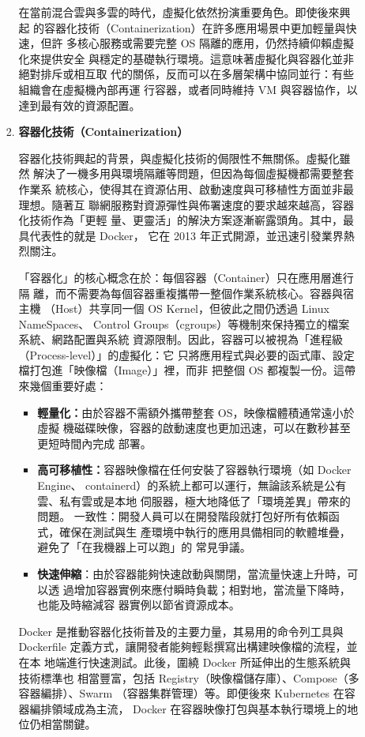 \documentclass[12pt,a4paper]{article}
\begin{document}
\begin{enumerate}[label={(\zhdig*)}, leftmargin=2\parindent, listparindent=\parindent]
\begin{enumerate}[label={(\arabic*)}, leftmargin=\parindent, listparindent=\parindent]
\begin{enumerate}[label={(\zhdig*)}, leftmargin=2\parindent, listparindent=\parindent]
    在當前混合雲與多雲的時代，虛擬化依然扮演重要角色。即使後來興起
    的容器化技術（Containerization）在許多應用場景中更加輕量與快速，但許
    多核心服務或需要完整 OS 隔離的應用，仍然持續仰賴虛擬化來提供安全
    與穩定的基礎執行環境。這意味著虛擬化與容器化並非絕對排斥或相互取
    代的關係，反而可以在多層架構中協同並行：有些組織會在虛擬機內部再運
    行容器，或者同時維持 VM 與容器協作，以達到最有效的資源配置。
\item\textbf{
容器化技術（Containerization）\cite{9}
}

容器化技術興起的背景，與虛擬化技術的侷限性不無關係。虛擬化雖然
解決了一機多用與環境隔離等問題，但因為每個虛擬機都需要整套作業系
統核心，使得其在資源佔用、啟動速度與可移植性方面並非最理想。隨著互
聯網服務對資源彈性與佈署速度的要求越來越高，容器化技術作為「更輕
量、更靈活」的解決方案逐漸嶄露頭角。其中，最具代表性的就是 Docker，
它在 2013 年正式開源，並迅速引發業界熱烈關注。

「容器化」的核心概念在於：每個容器（Container）只在應用層進行隔
離，而不需要為每個容器重複攜帶一整個作業系統核心。容器與宿主機
（Host）共享同一個 OS Kernel，但彼此之間仍透過 Linux NameSpaces、
Control Groups（cgroups）等機制來保持獨立的檔案系統、網路配置與系統
資源限制。因此，容器可以被視為「進程級（Process-level）」的虛擬化：它
只將應用程式與必要的函式庫、設定檔打包進「映像檔（Image）」裡，而非
把整個 OS 都複製一份。這帶來幾個重要好處：
\begin{itemize}[leftmargin=\parindent, listparindent=\parindent]

\item\textbf{輕量化：}由於容器不需額外攜帶整套 OS，映像檔體積通常遠小於虛擬
機磁碟映像，容器的啟動速度也更加迅速，可以在數秒甚至更短時間內完成
部署。

\item\textbf{高可移植性：}容器映像檔在任何安裝了容器執行環境（如 Docker Engine、
containerd）的系統上都可以運行，無論該系統是公有雲、私有雲或是本地
伺服器，極大地降低了「環境差異」帶來的問題。
一致性：開發人員可以在開發階段就打包好所有依賴函式，確保在測試與生
產環境中執行的應用具備相同的軟體堆疊，避免了「在我機器上可以跑」的
常見爭議。

\item\textbf{快速伸縮}：由於容器能夠快速啟動與關閉，當流量快速上升時，可以透
過增加容器實例來應付瞬時負載；相對地，當流量下降時，也能及時縮減容
器實例以節省資源成本。
\end{itemize}

Docker 是推動容器化技術普及的主要力量，其易用的命令列工具與
Dockerfile 定義方式，讓開發者能夠輕鬆撰寫出構建映像檔的流程，並在本
地端進行快速測試。此後，圍繞 Docker 所延伸出的生態系統與技術標準也
相當豐富，包括 Registry（映像檔儲存庫）、Compose（多容器編排）、Swarm
（容器集群管理）等。即便後來 Kubernetes 在容器編排領域成為主流，
Docker 在容器映像打包與基本執行環境上的地位仍相當關鍵。


\end{enumerate}
\end{enumerate}
\end{enumerate}
\end{document}
